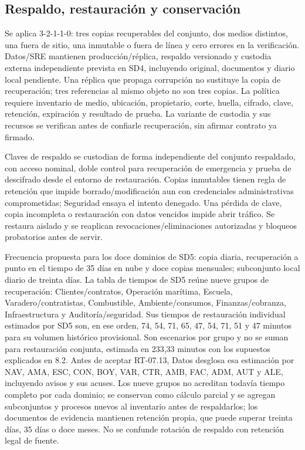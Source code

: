 \subsection{Respaldo, restauración y conservación}\label{sec:sd8-backup}
Se aplica 3-2-1-1-0: tres copias recuperables del conjunto, dos medios distintos, una fuera de sitio, una inmutable o fuera de línea y cero errores en la verificación. Datos/SRE mantienen producción/réplica, respaldo versionado y custodia externa independiente prevista en SD4, incluyendo original, documentos y diario local pendiente. Una réplica que propaga corrupción no sustituye la copia de recuperación; tres referencias al mismo objeto no son tres copias. La política requiere inventario de medio, ubicación, propietario, corte, huella, cifrado, clave, retención, expiración y resultado de prueba. La variante de custodia y sus recursos se verifican antes de confiarle recuperación, sin afirmar contrato ya firmado.

Claves de respaldo se custodian de forma independiente del conjunto respaldado, con acceso nominal, doble control para recuperación de emergencia y prueba de descifrado desde el entorno de restauración. Copias inmutables tienen regla de retención que impide borrado/modificación aun con credenciales administrativas comprometidas; Seguridad ensaya el intento denegado. Una pérdida de clave, copia incompleta o restauración con datos vencidos impide abrir tráfico. Se restaura aislado y se reaplican revocaciones/eliminaciones autorizadas y bloqueos probatorios antes de servir. \parencites[art.~20; pp.~14--15]{sd8-ba}[RT-07.09--13; p.~18]{sd8-bt}

Frecuencia propuesta para los doce dominios de SD5: copia diaria, recuperación a punto en el tiempo de 35 días en nube y doce copias mensuales; subconjunto local diario de treinta días. La tabla de tiempos de SD5 reúne nueve grupos de recuperación: Clientes/contratos, Operación marítima, Escuela, Varadero/contratistas, Combustible, Ambiente/consumos, Finanzas/cobranza, Infraestructura y Auditoría/seguridad. Sus tiempos de restauración individual estimados por SD5 son, en ese orden, 74, 54, 71, 65, 47, 54, 71, 51 y 47 minutos para su volumen histórico provisional. Son escenarios por grupo y no se suman para restauración conjunta, estimada en 233,33 minutos con los supuestos explicados en 8.2. Antes de aceptar RT-07.13, Datos desglosa esa estimación por NAV, AMA, ESC, CON, BOY, VAR, CTR, AMB, FAC, ADM, AUT y ALE, incluyendo avisos y sus acuses. Los nueve grupos no acreditan todavía tiempo completo por cada dominio; se conservan como cálculo parcial y se agregan subconjuntos y procesos nuevos al inventario antes de respaldarlos; los documentos de evidencia mantienen retención propia, que puede superar treinta días, 35 días o doce meses. No se confunde rotación de respaldo con retención legal de fuente.

